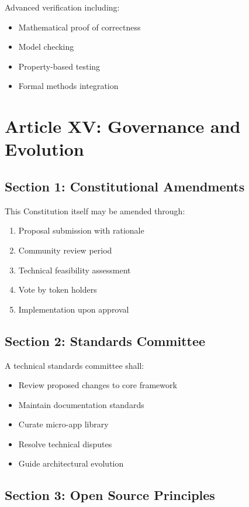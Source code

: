 \documentclass[12pt,letterpaper]{article}
\begin{document}
Advanced verification including:

\begin{itemize}
    \item Mathematical proof of correctness
    \item Model checking
    \item Property-based testing
    \item Formal methods integration
\end{itemize}

\section{Article XV: Governance and Evolution}

\subsection{Section 1: Constitutional Amendments}

This Constitution itself may be amended through:

\begin{enumerate}
    \item Proposal submission with rationale
    \item Community review period
    \item Technical feasibility assessment
    \item Vote by token holders
    \item Implementation upon approval
\end{enumerate}

\subsection{Section 2: Standards Committee}

A technical standards committee shall:

\begin{itemize}
    \item Review proposed changes to core framework
    \item Maintain documentation standards
    \item Curate micro-app library
    \item Resolve technical disputes
    \item Guide architectural evolution
\end{itemize}

\subsection{Section 3: Open Source Principles}
\end{document}
